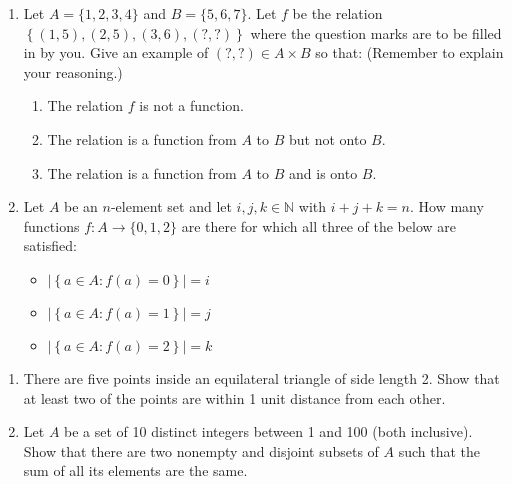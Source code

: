 \documentclass{article}
\theoremstyle{definition}
\begin{document}
\begin{question}
    \begin{enumerate}
        \item Let $A = \{1,2,3,4\}$ and $B = \{5,6,7\}$.
        Let $f$ be the relation $ \left\{(1,5),(2,5),(3,6),(?,?)\right\} $ where the question marks are to be filled in by you. 
        Give an example of $(?,?) \in A \times B$ so that: (Remember to explain your reasoning.)
            \begin{enumerate}
                \item The relation $f$ is not a function.
                \item The relation is a function from $A$ to $B$ but not onto $B$.
                \item The relation is a function from $A$ to $B$ and is onto $B$.
            \end{enumerate}

        \item     Let $A$ be an $n$-element set and let $i, j, k \in \mathbb{N}$ with $i+j+k = n$.
        How many functions $f \colon A \to \{0,1,2\}$ are there for which all three of the below are satisfied:
            \begin{itemize}
                \item $\left|\left\{ a \in A : f(a) = 0 \right\} \right| = i$
                \item $\left|\left\{ a \in A : f(a) = 1 \right\} \right| = j$
                \item $\left|\left\{ a \in A : f(a) = 2 \right\} \right| = k$
            \end{itemize}
    \end{enumerate}
\end{question}
\begin{solution}
\end{solution}

\begin{question}
    \begin{enumerate}
	\item There are five points inside an equilateral triangle of side length 2. 
	Show that at least two of the points are within 1 unit distance from each other.
	\item Let $A$ be a set of 10 distinct integers between 1 and 100 (both inclusive). 
	Show that there are two nonempty and disjoint subsets of $A$ such that the sum of all its elements are the same.
    \end{enumerate}
\end{question}
\begin{solution}
\end{solution}
\end{document}
